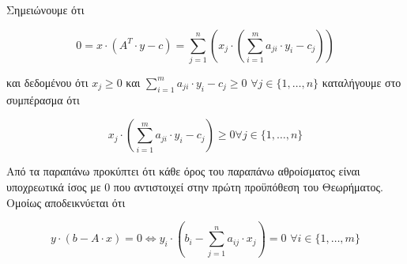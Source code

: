 \documentclass[12pt]{article}
\newcommand{\margin}{\hspace{4pt}}
\begin{document}
Σημειώνουμε ότι

\[ 0 = x \cdot (A^T \cdot y - c)  = \sum_{j = 1}^{n}(x_j \cdot (\sum_{i = 1}^{m} a_{ji} \cdot y_i - c_j)) \]

και δεδομένου ότι \( x_j \geq 0 \) και \( \sum_{i = 1}^{m} a_{ji} \cdot y_i - c_j \geq 0 \)
\( \forall j \in \{1, \ldots, n \} \) καταλήγουμε στο συμπέρασμα ότι

\[ x_j \cdot (\sum_{i = 1}^{m} a_{ji} \cdot y_i - c_j) \geq 0 \forall j \in \{ 1, \ldots, n \} \]

Από τα παραπάνω προκύπτει ότι κάθε όρος του παραπάνω αθροίσματος είναι υποχρεωτικά ίσος με 0
που αντιστοιχεί στην πρώτη προϋπόθεση του Θεωρήματος. \\

Ομοίως αποδεικνύεται ότι

\[ y \cdot ( b - A \cdot x ) = 0 \Leftrightarrow y_i \cdot ( b_i - \sum_{j = 1}^{n} a_{ij} \cdot x_j ) = 0 \margin \forall i \in \{ 1, \ldots, m \} \]

\vspace{2in}

\pagebreak
\end{document}
